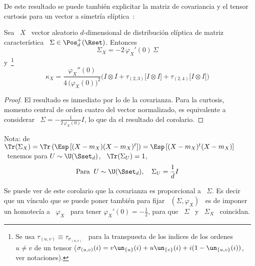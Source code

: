 De este  resultado se puede tambi\'en  explicitar la matriz de  covariancia y el
tensor curtosis para un vector a simetr\'ia el\'iptica~\cite[p.~44]{FanKot90}:
%
\begin{corolario}
\label{Cor:MP:MediaCovarianzaEliptica}
%
  Sea \ $X$  \ vector aleatorio $d$-dimensional de  distribuci\'on el\'iptica de
  matriz caracter\'istica \ $\Sigma \in \Pos_d^+(\Rset)$. Entonces
  \[
  \Sigma_X = - 2 \,  \varphi_X'(0) \, \Sigma
  \]
  y~\footnote{Se usa $\tau_{(u,v)}  \equiv \tau_{\sigma_{(u,v)}}$  \  para la
  transpuesta  de  los   indices  de  los  ordenes  $u  \ne   v$  de  un  tensor
  ($\sigma_{(u,v)}(i)   =   v   \un_{\{u\}}(i)    +   u   \un_{\{v\}}(i)   +   i
  (1-\un_{\{u,v\}}(i))$, ver notaciones).}
  \[
  \kappa_X  = \frac{\varphi_X''(0)}{4  \,  \big( \varphi_X(0)  \big)^2} \Big(  I
  \otimes I + \tau_{(2,3)}\big[ I  \otimes I \big] + \tau_{(2,4)}\big[ I \otimes
  I \big] \Big)
  \]
\end{corolario}
\begin{proof}
  El resultado es inmediato por lo  de la covarianza.  Para la curtosis, momento
  central de orden cuatro del  vector normalizado, es equivalente a considerar \
  $\Sigma  = -  \frac{1}{2  \, \varphi_X(0)}  I$,  lo que  da  el resultado  del
  corolario.
\end{proof}
%
Nota: de $\Tr(\Sigma_X) = \Tr\left( \Esp\left[ (X-m_X) (X-m_X)^t \right] \right)
= \Esp\left[ (X-m_X)^t  (X-m_X) \right]$ \ tenemos para  $U \sim \U(\Sset_d)$, \
$\Tr(\Sigma_U) = 1$, \ie
%
\[
\mbox{Para } \: U \sim \U(\Sset_d), \quad \Sigma_U = \frac{1}{d} I
\]

Se  puede  ver  de  este  corolario  que  la  covarianza  es  proporcional  a  \
$\Sigma$. Es decir que un v\'inculo que se puede poner tambi\'en para fijar \ $(
\Sigma ,  \varphi_X )$ \  es de  imponer un homotec\'ia  a \ $\varphi_X$  \ para
tener  $\varphi_X'(0) =  - \frac12$,  para que  \ $\Sigma$  \ y  \  $\Sigma_X$ \
coincidan.

